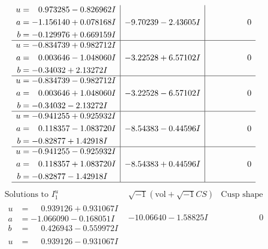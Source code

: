 \documentclass[1p]{elsarticle_modified}
\theoremstyle{definition}
\newcommand{\I}{\sqrt{-1}}
\begin{document}
$$\begin{array}{c|c|c}
\begin{aligned}
u &= \phantom{-}0.973285 - 0.826962 I \\
a &= -1.156140 + 0.078168 I \\
b &= -0.129976 + 0.669159 I\end{aligned}
 & -9.70239 - 2.43605 I & \phantom{-0.000000 } 0 \\ \hline\begin{aligned}
u &= -0.834739 + 0.982712 I \\
a &= \phantom{-}0.003646 - 1.048060 I \\
b &= -0.34032 + 2.13272 I\end{aligned}
 & -3.22528 + 6.57102 I & \phantom{-0.000000 } 0 \\ \hline\begin{aligned}
u &= -0.834739 - 0.982712 I \\
a &= \phantom{-}0.003646 + 1.048060 I \\
b &= -0.34032 - 2.13272 I\end{aligned}
 & -3.22528 - 6.57102 I & \phantom{-0.000000 } 0 \\ \hline\begin{aligned}
u &= -0.941255 + 0.925932 I \\
a &= \phantom{-}0.118357 - 1.083720 I \\
b &= -0.82877 + 1.42918 I\end{aligned}
 & -8.54383 - 0.44596 I & \phantom{-0.000000 } 0 \\ \hline\begin{aligned}
u &= -0.941255 - 0.925932 I \\
a &= \phantom{-}0.118357 + 1.083720 I \\
b &= -0.82877 - 1.42918 I\end{aligned}
 & -8.54383 + 0.44596 I & \phantom{-0.000000 } 0\\
 \hline 
 \end{array}$$\newpage$$\begin{array}{c|c|c}  
\text{Solutions to }I^u_{1}& \I (\text{vol} + \sqrt{-1}CS) & \text{Cusp shape}\\
 \hline 
\begin{aligned}
u &= \phantom{-}0.939126 + 0.931067 I \\
a &= -1.066090 - 0.168051 I \\
b &= \phantom{-}0.426943 - 0.559972 I\end{aligned}
 & -10.06640 - 1.58825 I & \phantom{-0.000000 } 0 \\ \hline\begin{aligned}
u &= \phantom{-}0.939126 - 0.931067 I \\

\end{aligned}
\end{array}$$
\end{document}
